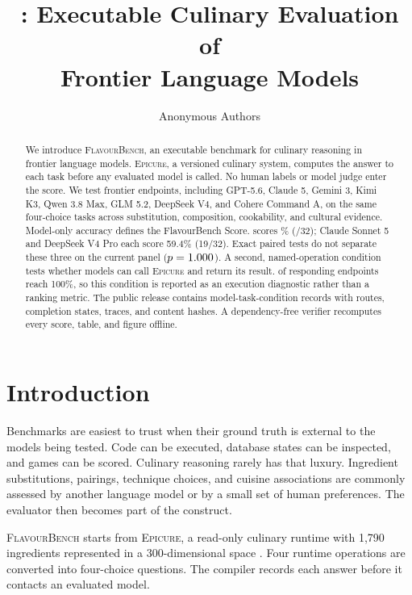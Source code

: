\documentclass{article}
\title{\system{}: Executable Culinary Evaluation of\\Frontier Language Models}
\author{Anonymous Authors}
\newcommand{\system}{\textsc{FlavourBench}}
\newcommand{\epicure}{\textsc{Epicure}}
\begin{document}
\raggedbottom
\maketitle

\begin{abstract}
  We introduce \system{}, an executable benchmark for culinary reasoning in frontier language
  models. \epicure{}, a versioned culinary system, computes the answer to each task before any
  evaluated model is called. No human labels or model judge enter the score. We test \FBModels{}
  frontier endpoints, including
  GPT-5.6, Claude 5, Gemini 3, Kimi K3, Qwen 3.8 Max, GLM 5.2, DeepSeek V4, and Cohere Command A,
  on the same \FBTasks{} four-choice tasks across substitution, composition, cookability, and
  cultural evidence. Model-only accuracy defines the FlavourBench Score. \FBTopModel{} scores
  \FBTopScore{}\% (\FBTopCorrect{}/32); Claude Sonnet 5 and DeepSeek V4 Pro each score 59.4\%
  (19/32). Exact paired tests do not separate these three on the current panel
  ($p=1.000{}$). A second, named-operation condition tests whether models can call
  \epicure{} and return its result. \FBAssistedCeilingModels{} of
  \FBAssistedEligibleModels{} responding endpoints reach 100\%, so this condition is reported as
  an execution diagnostic rather than a ranking metric. The public release contains \FBArms{}
  model-task-condition records with routes, completion states, traces, and content hashes. A
  dependency-free verifier recomputes every score, table, and figure offline.
  \end{abstract}

\section{Introduction}

Benchmarks are easiest to trust when their ground truth is external to the models being tested.
Code can be executed, database states can be inspected, and games can be scored. Culinary
reasoning rarely has that luxury. Ingredient substitutions, pairings, technique choices, and
cuisine associations are commonly assessed by another language model or by a small set of human
preferences. The evaluator then becomes part of the construct.

\system{} starts from \epicure{}, a read-only culinary runtime with 1,790 ingredients represented
in a 300-dimensional space \cite{radzikowski2026structure,radzikowski2026geometry}. Four runtime
operations are converted into four-choice questions. The compiler records each answer before it
contacts an evaluated model.
\end{document}
